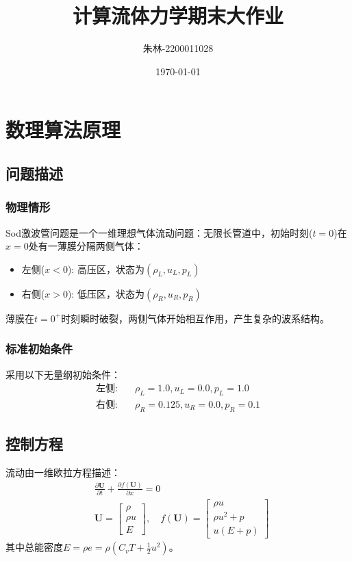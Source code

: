 \documentclass[UTF8]{ctexart}
\begin{document}
\title{计算流体力学期末大作业}
\author{朱林-2200011028}
\date{\today}
\maketitle

\section{数理算法原理}
\subsection{问题描述}
\subsubsection{物理情形}
Sod激波管问题是一个一维理想气体流动问题：无限长管道中，初始时刻($t=0$)在$x=0$处有一薄膜分隔两侧气体：
\begin{itemize}
    \item 左侧($x<0$): 高压区，状态为$(\rho_L, u_L, p_L)$
    \item 右侧($x>0$): 低压区，状态为$(\rho_R, u_R, p_R)$
\end{itemize}

薄膜在$t=0^+$时刻瞬时破裂，两侧气体开始相互作用，产生复杂的波系结构。

\subsubsection{标准初始条件}
采用以下无量纲初始条件：
\begin{align*}
\text{左侧:} & \quad \rho_L = 1.0,  u_L = 0.0,  p_L = 1.0 \\
\text{右侧:} & \quad \rho_R = 0.125,  u_R = 0.0,  p_R = 0.1
\end{align*}

\subsection{控制方程}
流动由一维欧拉方程描述：
\begin{align}
&\frac{\partial \mathbf{U}}{\partial t} + \frac{\partial f(\mathbf{U})}{\partial x} = 0 \\
&\mathbf{U} = \begin{bmatrix} \rho \\ \rho u \\ E \end{bmatrix}, \quad
f(\mathbf{U}) = \begin{bmatrix} \rho u \\ \rho u^2 + p \\ u(E + p) \end{bmatrix}
\end{align}
其中总能密度$E = \rho e = \rho (C_v T + \frac{1}{2}u^2)$。
\end{document}
